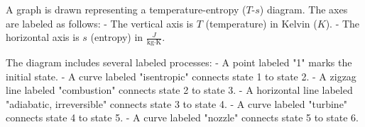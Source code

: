 A graph is drawn representing a temperature-entropy (\( T \)-\( s \)) diagram. The axes are labeled as follows:  
- The vertical axis is \( T \) (temperature) in Kelvin (\( K \)).  
- The horizontal axis is \( s \) (entropy) in \( \frac{J}{\text{kg·K}} \).  

The diagram includes several labeled processes:  
- A point labeled "1" marks the initial state.  
- A curve labeled "isentropic" connects state 1 to state 2.  
- A zigzag line labeled "combustion" connects state 2 to state 3.  
- A horizontal line labeled "adiabatic, irreversible" connects state 3 to state 4.  
- A curve labeled "turbine" connects state 4 to state 5.  
- A curve labeled "nozzle" connects state 5 to state 6.